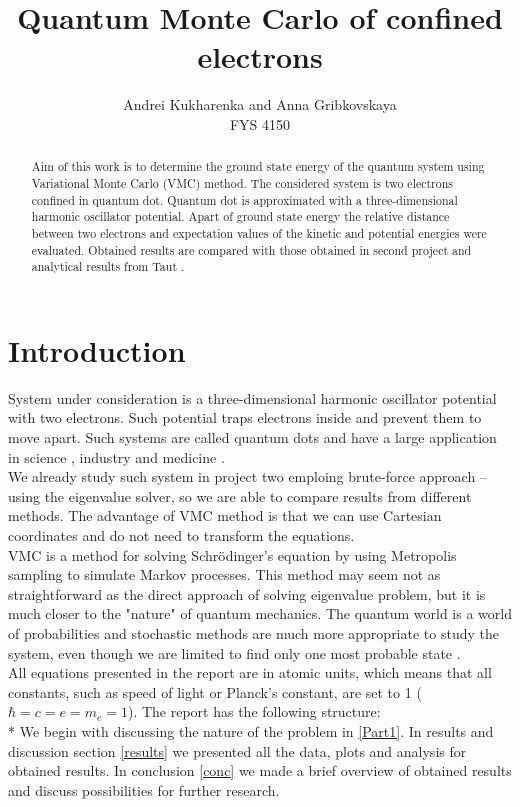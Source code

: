 \documentclass[10pt]{article}
\begin{document}
\setlength\parindent{1pt}
\title{Quantum Monte Carlo of confined electrons }
\author{Andrei Kukharenka and Anna Gribkovskaya \\  
FYS 4150 
}

\maketitle
\begin{abstract}
Aim of this work is to determine the ground state energy of the quantum system using Variational Monte Carlo (VMC) method. The considered system is two electrons confined in quantum dot. Quantum dot is approximated with a three-dimensional harmonic oscillator potential. Apart of ground state energy the relative distance between two electrons and expectation values of the kinetic and potential energies were evaluated. Obtained results are compared with those obtained in second project\cite{proj2} and analytical results from Taut \cite{three}. 
\end{abstract}
\clearpage 


\section{Introduction}
System under consideration is a three-dimensional harmonic oscillator potential with two electrons. Such potential traps electrons inside and prevent them to move apart. Such systems are called quantum dots and have a large application in science \cite{four}, industry\cite{five} and medicine \cite{med}. \\
We already study such system in project two \cite{proj2} emploing brute-force approach -- using the eigenvalue solver, so we are able to compare results from different methods. The advantage of VMC method is that we can use Cartesian coordinates and do not need to transform the equations. \\ 
VMC is a method for solving Schr\"{o}dinger's equation by using Metropolis sampling to simulate Markov processes. This method may seem not as straightforward as the direct approach of solving eigenvalue problem, but it is much closer to the "nature" of quantum mechanics. The quantum world is a world of probabilities and stochastic methods are much more appropriate to study the system, even though we are limited to find only one most probable state \cite{one}. \\
All equations presented in the report are in atomic units, which means that all constants, such as speed of light or Planck's constant, are set to 1 ($\hbar=c=e=m_e=1$).
The report has the following structure:\\*
We begin with discussing the nature of the problem in \ref{Part1}.
In results and discussion section \ref{results} we presented all the data, plots and analysis for obtained results. 
In conclusion \ref{conc} we made a brief overview of obtained results and discuss possibilities for further research. 
\end{document}
